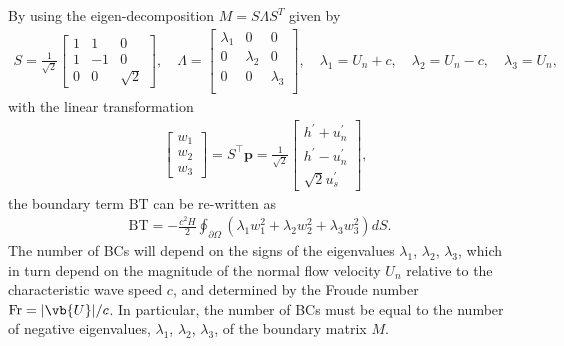 \documentclass{article}
\numberwithin{equation}{section}
\def\1{\chi}
\theoremstyle{definition}
\begin{document}
By using the eigen-decomposition ${M} = S\Lambda S^{T}$ given by
\begin{eqnarray}
\label{eq:eigen_decompose}
S = \frac{1}{\sqrt{2}}\begin{bmatrix}
        1&1 & 0\\
        1&-1&0\\
        0 & 0 & \sqrt{2}
    \end{bmatrix},
    \quad
    \Lambda = \begin{bmatrix}
        \lambda_1&0&0\\
        0&\lambda_2&0\\
        0&0&\lambda_3\\
    \end{bmatrix},
    \quad 
    \lambda_1 = U_n+c, \quad  \lambda_2 = U_n-c, \quad \lambda_3 = U_n,
\end{eqnarray}
with the linear transformation
\begin{eqnarray}
\label{eq:linear_transform}
    &\begin{bmatrix}
            w_1\\
            w_2\\
            w_3
        \end{bmatrix} 
        = {S}^{\top} \textbf{p} =  \frac{1}{\sqrt{2}}
    \begin{bmatrix}
        h^{\prime}+u_n^{\prime} \\ 
        h^{\prime}-u_n^{\prime}\\
        \sqrt{2}u_s^{\prime}
    \end{bmatrix},
\end{eqnarray}
the boundary term $\mathrm{BT}$ can be re-written as 
  \begin{eqnarray}
        \label{eq:boundary_term_0}
\mathrm{BT}=-\frac{c^2H}{2}\oint_{\partial \Omega}
\left(\lambda_1 w_1^2 + \lambda_2 w_2^2 + \lambda_3 w_3^2 \right)dS.
\end{eqnarray}  
The number of BCs will depend on the signs of the eigenvalues $\lambda_1$, $\lambda_2$, $\lambda_3$, which in turn depend on the magnitude of the normal flow velocity $U_n$ relative to the characteristic wave speed $c$, and determined by the Froude number $\operatorname{Fr} = |\vb{U}|/c$.  In particular, the number of BCs must be equal to the number of negative eigenvalues, $\lambda_1$, $\lambda_2$, $\lambda_3$, of the boundary matrix $M$.  
\end{document}

